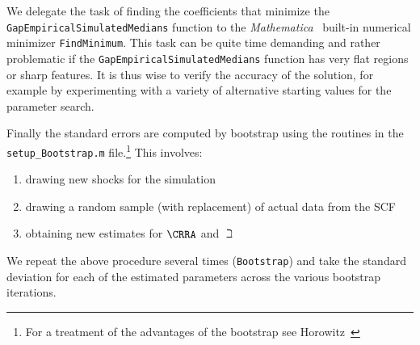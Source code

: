 \documentclass[titlepage, headings=optiontotocandhead]{\econtex}
\newcommand{\Mma}{\textit{Mathematica}}
\begin{document}
We delegate the task of finding the coefficients that minimize the
\texttt{GapEmpiricalSimulatedMedians} function to the \Mma~
built-in numerical minimizer \texttt{FindMinimum}.  This task can be
quite time demanding and rather problematic if the
\texttt{GapEmpiricalSimulatedMedians} function has very flat regions
or sharp features. It is thus wise to verify the accuracy of the
solution, for example by experimenting with a variety of alternative starting values for the
parameter search.

Finally the standard errors are computed by bootstrap using the
routines in the \texttt{setup\_Bootstrap.m} file.\footnote{For a
  treatment of the advantages of the bootstrap see
  Horowitz~\citeyearpar{horowitzBootstrap}} This involves:
\begin{enumerate}
\item drawing new shocks for the simulation
\item drawing a random sample (with replacement) of actual data from the SCF
\item obtaining new estimates for $\CRRA$ and ${\beth}$
\end{enumerate}
We repeat the above procedure several times (\texttt{Bootstrap}) and take the standard deviation for each of the estimated parameters across the various bootstrap iterations.
\end{document}
